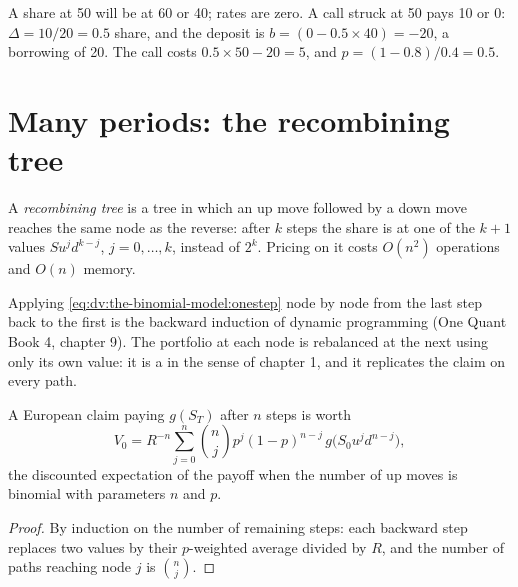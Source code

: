 \begin{example}\label{ex:dv:the-binomial-model:onestep}
A share at 50 will be at 60 or 40; rates are zero. A call struck at 50 pays 10 or
0: $\Delta=10/20=0.5$ share, and the deposit is $b=(0-0.5\times40)=-20$, a
borrowing of 20. The call costs $0.5\times50-20=5$, and $p=(1-0.8)/0.4=0.5$.
\end{example}

\section{Many periods: the recombining tree}

\begin{definition}\label{def:dv:the-binomial-model:recombining}
A \emph{recombining tree} is a tree in which an up move
followed by a down move reaches the same node as the reverse: after $k$ steps
the share is at one of the $k+1$ values $Su^jd^{k-j}$, $j=0,\dots,k$, instead of
$2^k$. Pricing on it costs $O(n^2)$ operations and $O(n)$ memory.
\end{definition}

Applying \eqref{eq:dv:the-binomial-model:onestep} node by node from the last
step back to the first is the backward induction of dynamic programming (One
Quant Book 4, chapter 9). The portfolio at each node is rebalanced at the next
using only its own value: it is a  in the sense of
chapter 1, and it replicates the claim on every path.

\begin{proposition}\label{prop:dv:the-binomial-model:formula}
A European claim paying $g(S_T)$ after $n$ steps is worth
\[
V_0=R^{-n}\sum_{j=0}^{n}\binom{n}{j}p^j(1-p)^{n-j}\,g\bigl(S_0u^jd^{n-j}\bigr),
\]
the discounted expectation of the payoff when the number of up moves is binomial
with parameters $n$ and $p$.
\end{proposition}
\begin{proof}
By induction on the number of remaining steps: each backward step replaces two
values by their $p$-weighted average divided by $R$, and the number of paths
reaching node $j$ is $\binom{n}{j}$.
\end{proof}

